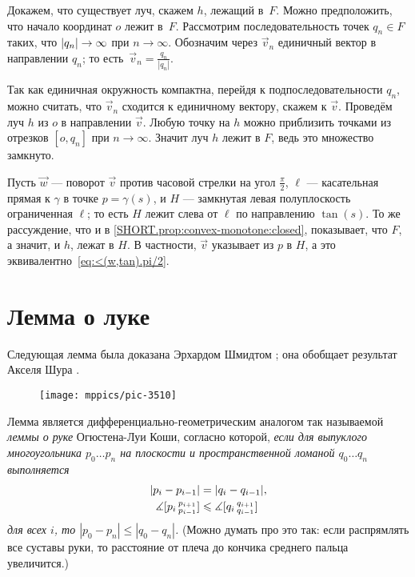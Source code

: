 Докажем, что существует луч, скажем $h$, лежащий в~$F$.
Можно предположить, что начало координат $o$ лежит в~$F$.
Рассмотрим последовательность точек $q_n\in F$ таких, что $|q_n|\z\to \infty$ при $n\to \infty$.
Обозначим через $\vec v_n$ единичный вектор в направлении $q_n$; то есть~$\vec v_n=\tfrac{q_n}{|q_n|}$.

Так как единичная окружность компактна, перейдя к подпоследовательности $q_n$, можно считать, что $\vec v_n$ сходится к единичному вектору, скажем к $\vec v$.
Проведём луч $h$ из $o$ в направлении $\vec v$.
Любую точку на $h$ можно приблизить точками из отрезков $[o,q_n]$ при $n\to\infty$.
Значит луч $h$ лежит в $F$, ведь это множество замкнуто.

Пусть $\vec w$ --- поворот $\vec v$ против часовой стрелки на угол $\tfrac\pi 2$,
$\ell$ --- касательная прямая к $\gamma$ в точке $p=\gamma(s)$,
и $H$ --- замкнутая левая полуплоскость ограниченная $\ell$;
то есть $H$ лежит слева от $\ell$ по направлению $\tan(s)$.
То же рассуждение, что и в \ref{SHORT.prop:convex-monotone:closed}, показывает, что $F$, а значит, и $h$,
лежат в $H$.
В частности, $\vec v$ указывает из $p$ в $H$, а это эквивалентно~\ref{eq:<(w,tan).pi/2}.
\qeds


\section{Лемма о луке}

Следующая лемма была доказана Эрхардом Шмидтом \cite{schmidt}; она обобщает результат Акселя Шура \cite{shur}.

\begin{wrapfigure}[9]{r}{39 mm}
\vskip-6mm
\centering
\texttt{[image: mppics/pic-3510]}
\vskip0mm
\end{wrapfigure}

{\sloppy

Лемма является дифференциально-геометрическим аналогом так называемой {}\emph{леммы о руке} Огюстена-Луи Коши, согласно которой, \textit{если для выпуклого многоугольника
$p_0\dots p_n$ на плоскости и пространственной ломаной $q_0\dots q_n$ выполняется 
\begin{align*}
|p_i-p_{i-1}|&=|q_i-q_{i-1}|,
\\
\measuredangle[p_i\,{}^{p_{i+1}}_{p_{i-1}}]&\leqslant \measuredangle[q_i\,{}^{q_{i+1}}_{q_{i-1}}]
\end{align*}
для всех $i$, то $|p_0-p_n|\le |q_0-q_n|$.}
(Можно думать про это так: если распрямлять все суставы руки, то расстояние от плеча до кончика среднего пальца увеличится.)

}

